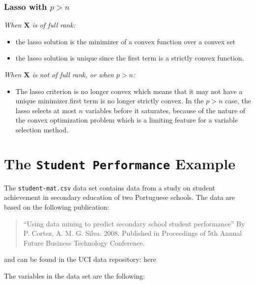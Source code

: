 \documentclass[
]{book}
\providecommand{\tightlist}{%
  \setlength{\itemsep}{0pt}\setlength{\parskip}{0pt}}
\begin{document}
\subsubsection*{\texorpdfstring{Lasso with \(p>n\)}{Lasso with p\textgreater n}}\label{lasso-with-pn}

\emph{When \(\mathbf{X}\) is of full rank:}

\begin{itemize}
\item
  the lasso solution is the minimizer of a convex function over a convex set
\item
  the lasso solution is unique since the first term is a strictly convex function.
\end{itemize}

\emph{When \(\mathbf{X}\) is not of full rank, or when \(p>n\):}

\begin{itemize}
\tightlist
\item
  The lasso criterion is no longer convex which means that it may not have a unique minimizer.first term is no longer strictly convex. In the \(p>n\) case, the lasso selects at most \(n\) variables before it saturates, because of the nature of the convex optimization problem which is a limiting feature for a variable selection method.
\end{itemize}

\section{\texorpdfstring{The \texttt{Student\ Performance} Example}{The Student Performance Example}}\label{the-student-performance-example}

The \texttt{student-mat.csv} data set contains data from a study on student achievement in secondary education of two Portuguese schools. The data are based on the following publication:

\begin{quote}
``Using data mining to predict secondary school student performance''
By P. Cortez, A. M. G. Silva. 2008. Published in Proceedings of 5th Annual Future Business Technology Conference.
\end{quote}

and can be found in the UCI data repository: here

The variables in the data set are the following:
\end{document}

